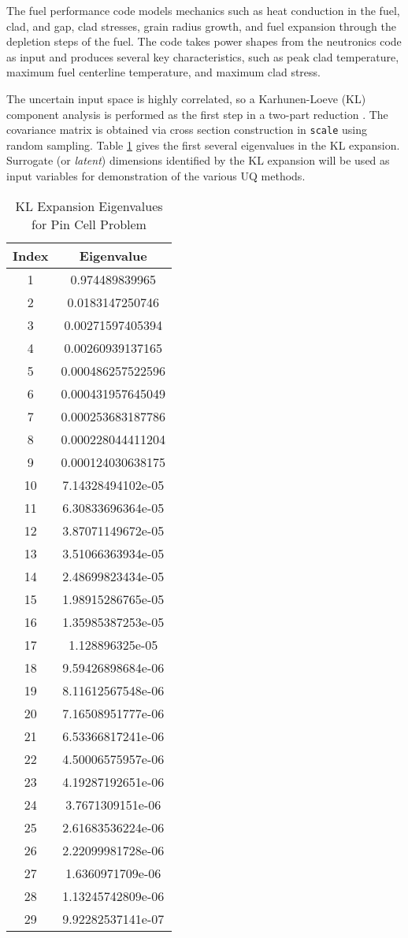 The fuel performance code models mechanics such as heat conduction in the fuel, clad, and gap, clad stresses, grain radius
growth, and fuel expansion through the depletion steps of the fuel. The code takes power shapes
from the neutronics code as input and produces several key characteristics, such as peak clad temperature, maximum
fuel centerline temperature, and maximum clad stress.

The uncertain input space is highly correlated, so a Karhunen-Loeve (KL) component analysis is performed as
the first step in a two-part reduction \cite{physor2016}. The
covariance matrix is obtained via cross section construction in \texttt{scale}\cite{scale} using random sampling.  
Table \ref{tab:pcarank} gives the first several eigenvalues in the KL expansion.  Surrogate (or
\emph{latent}) dimensions identified by the KL expansion will be used as input variables for demonstration of
the various UQ methods.

\begin{table}[H]
  \centering
  \begin{tabular}{c|c}
Index & Eigenvalue \\ \hline
1 & 0.974489839965 \\
2 & 0.0183147250746 \\
3 & 0.00271597405394 \\
4 & 0.00260939137165 \\
5 & 0.000486257522596 \\
6 & 0.000431957645049 \\
7 & 0.000253683187786 \\
8 & 0.000228044411204 \\
9 & 0.000124030638175 \\
10 & 7.14328494102e-05 \\
11 & 6.30833696364e-05 \\
12 & 3.87071149672e-05 \\
13 & 3.51066363934e-05 \\
14 & 2.48699823434e-05 \\
15 & 1.98915286765e-05 \\
16 & 1.35985387253e-05 \\
17 & 1.128896325e-05 \\
18 & 9.59426898684e-06 \\
19 & 8.11612567548e-06 \\
20 & 7.16508951777e-06 \\
21 & 6.53366817241e-06 \\
22 & 4.50006575957e-06 \\
23 & 4.19287192651e-06 \\
24 & 3.7671309151e-06 \\
25 & 2.61683536224e-06 \\
26 & 2.22099981728e-06 \\
27 & 1.6360971709e-06 \\
28 & 1.13245742809e-06 \\
29 & 9.92282537141e-07
\end{tabular}
\caption{KL Expansion Eigenvalues for Pin Cell Problem}
\label{tab:pcarank}
\end{table}
